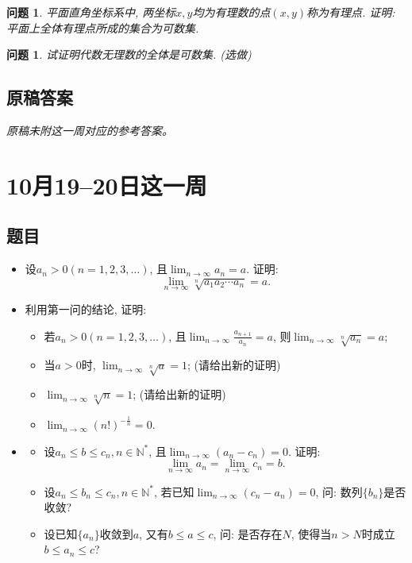 \documentclass[UTF8,11pt, a4paper, oneside, fontset=none]{ctexbook}
\newtheorem{question}[theorem]{问题}
\begin{document}
\begin{question}
平面直角坐标系中, 两坐标$x, y$均为有理数的点$(x, y)$称为有理点. 证明: 平面上全体有理点所成的集合为可数集.
\end{question}

\begin{question}
试证明代数无理数的全体是可数集. (选做)

\end{question}

\clearpage

\subsection*{原稿答案}

\noindent\emph{原稿未附这一周对应的参考答案。}

\clearpage

\section{10月19--20日这一周}

\subsection*{题目}

\begin{itemize}
\item[1.] 设$a_n>0 (n = 1, 2, 3, \ldots)$, 且$\lim_{n \to \infty} a_n =a$. 证明:
\[
\lim_{n \to \infty} \sqrt[n]{a_1 a_2 \cdots a_n} = a.
\]
\item[2.] 利用第一问的结论, 证明:
\begin{itemize}
\item[(1)] 若$a_n>0 (n = 1, 2, 3, \ldots)$, 且$\lim_{n \to \infty}\frac{a_{n+1}}{a_n} =a$, 则$\lim_{n \to \infty} \sqrt[n]{a_n} =a$;
\item[(2)] 当$a>0$时, $\lim_{n \to \infty} \sqrt[n]{a} = 1$; (请给出新的证明)
\item[(3)] $\lim_{n \to \infty} \sqrt[n]{n} =1$; (请给出新的证明)
\item[(4)] $\lim_{n \to \infty} (n!)^{-\frac{1}{n}} =0$.
\end{itemize} 
\end{itemize}

\begin{itemize}
\item[3.]
\begin{itemize}
\item[(1)] 设$a_n \leq b \leq c_n, n \in \mathbb N^*$, 且$\lim_{n \to \infty} (a_n - c_n) =0$. 证明:
\[
\lim_{n \to \infty} a_n = \lim_{n \to \infty} c_n = b.
\]
\item[(2)] 设$a_n \leq b_n \leq c_n, n \in \mathbb N^*$, 若已知$\lim_{n \to \infty}(c_n -a_n) =0$, 问: 数列$\{b_n\}$是否收敛?
\item[(3)] 设已知$\{a_n\}$收敛到$a$, 又有$b \leq a \leq c$, 问: 是否存在$N$, 使得当$n >N$时成立$b \leq a_n \leq c$?
\end{itemize}
\end{itemize}
\end{document}
